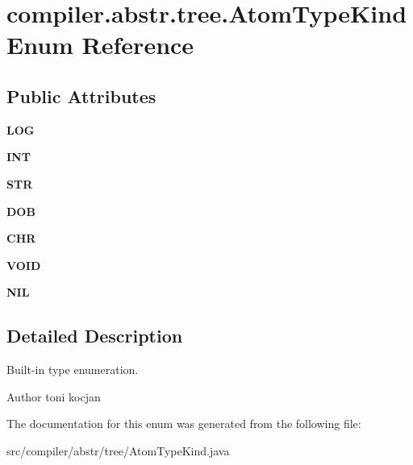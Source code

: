 \hypertarget{enumcompiler_1_1abstr_1_1tree_1_1_atom_type_kind}{}\section{compiler.\+abstr.\+tree.\+Atom\+Type\+Kind Enum Reference}
\label{enumcompiler_1_1abstr_1_1tree_1_1_atom_type_kind}
\subsection*{Public Attributes}
\begin{DoxyCompactItemize}
\item 
\mbox{\label{enumcompiler_1_1abstr_1_1tree_1_1_atom_type_kind_a396189c0491b3bbfe1d94ef482afe16a}} 
{\bfseries L\+OG}
\item 
\mbox{\label{enumcompiler_1_1abstr_1_1tree_1_1_atom_type_kind_af3472522541861ca383f95c2e181d5fa}} 
{\bfseries I\+NT}
\item 
\mbox{\label{enumcompiler_1_1abstr_1_1tree_1_1_atom_type_kind_a51c8faf6b127fddf84c3e194020574bc}} 
{\bfseries S\+TR}
\item 
\mbox{\label{enumcompiler_1_1abstr_1_1tree_1_1_atom_type_kind_a6e497ba15dc6de54a1b3960cadae3335}} 
{\bfseries D\+OB}
\item 
\mbox{\label{enumcompiler_1_1abstr_1_1tree_1_1_atom_type_kind_a2d4f528caffaacbf2e084a7865311540}} 
{\bfseries C\+HR}
\item 
\mbox{\label{enumcompiler_1_1abstr_1_1tree_1_1_atom_type_kind_ac191fc3e746101a4b2860d9afdf8d940}} 
{\bfseries V\+O\+ID}
\item 
\mbox{\label{enumcompiler_1_1abstr_1_1tree_1_1_atom_type_kind_a18872feaa531079e2edafd80866f2d68}} 
{\bfseries N\+IL}
\end{DoxyCompactItemize}


\subsection{Detailed Description}
Built-\/in type enumeration. \begin{DoxyAuthor}{Author}
toni kocjan 
\end{DoxyAuthor}


The documentation for this enum was generated from the following file\+:\begin{DoxyCompactItemize}
\item 
src/compiler/abstr/tree/Atom\+Type\+Kind.\+java\end{DoxyCompactItemize}
